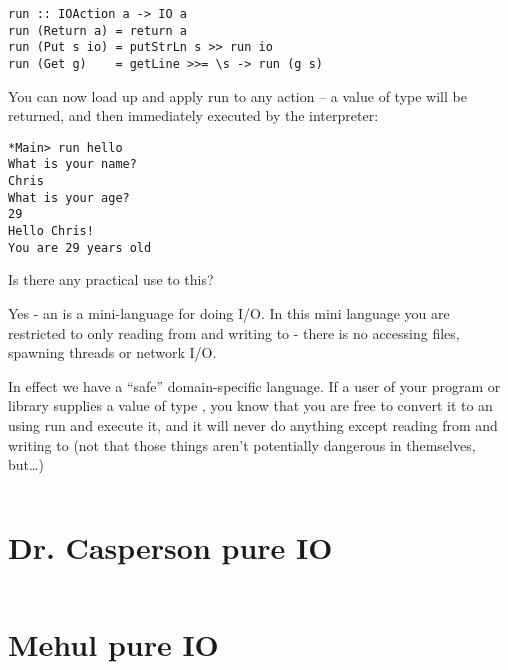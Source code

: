 \documentclass[thesis-solanki.tex]{subfiles}
\begin{document}
\begin{verbatim}
run :: IOAction a -> IO a
run (Return a) = return a
run (Put s io) = putStrLn s >> run io
run (Get g)    = getLine >>= \s -> run (g s)
\end{verbatim}

You can now load up  and apply run to any action --
a value of type   will be returned, and then immediately executed by the 
interpreter:

\begin{verbatim}
*Main> run hello
What is your name?
Chris
What is your age?
29
Hello Chris!
You are 29 years old

\end{verbatim}
Is there any practical use to this?

Yes -
an  is a mini-language for doing I/O. In this mini language you are restricted to only reading from  and writing to  -
there is no accessing files, spawning threads or network I/O.

In effect we have a 
``safe'' domain-specific language.
If a user of your program or library supplies a value of type  , you know that you are free to convert it to an   using run and execute it, 
and it will never do anything except reading from  and writing to  (not that those things aren't potentially dangerous in themselves, but\dots)


\begin{singlespace}
  \inputminted[linenos]{haskell}{haskell-proto4-purvey-wincer.hs}
\end{singlespace}

\section{Dr. Casperson pure IO}
\begin{singlespace}
  \inputminted[linenos]{haskell}{haskell-proto4-myrtle-uppers.hs}
\end{singlespace}

\section{Mehul pure IO}
\end{document}
